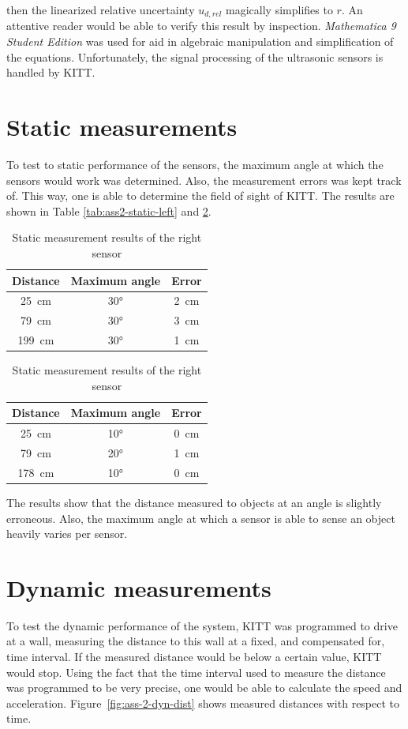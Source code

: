 \documentclass[11pt,titlepage]{report}
\begin{document}
then the linearized relative uncertainty $u_{d,rel}$ magically simplifies to $r$. An attentive reader would be able to verify this result by inspection. \textit{Mathematica 9 Student Edition} was used for aid in algebraic manipulation and simplification of the equations. Unfortunately, the signal processing of the ultrasonic sensors is handled by KITT.

\section{Static measurements}
To test to static performance of the sensors, the maximum angle at which the sensors would work was determined. Also, the measurement errors was kept track of. This way, one is able to determine the field of sight of KITT. The results are shown in Table \ref{tab:ass2-static-left} and \ref{tab:ass2-static-right}.
\begin{table}[H]
	\parbox{.45\linewidth}{
		\centering
		\caption{Static measurement results of the left sensor}
		\label{tab:ass2-static-left}
		\begin{tabular}{c c c}
			\hline\hline
			Distance & Maximum angle & Error \\
			\hline
			\SI{25}{cm} & \ang{30} & \SI{2}{cm} \\
			\SI{79}{cm} & \ang{30} & \SI{3}{cm} \\
			\SI{199}{cm} & \ang{30} & \SI{1}{cm} \\
			\hline
		\end{tabular}
	}
	\parbox{.45\linewidth}{
		\centering
		\caption{Static measurement results of the right sensor}
		\label{tab:ass2-static-right}
		\begin{tabular}{c c c}
			\hline\hline
			Distance & Maximum angle & Error \\
			\hline
			\SI{25}{cm} & \ang{10} & \SI{0}{cm} \\
			\SI{79}{cm} & \ang{20} & \SI{1}{cm} \\
			\SI{178}{cm} & \ang{10} & \SI{0}{cm} \\
			\hline
		\end{tabular}
	}
\end{table}

The results show that the distance measured to objects at an angle is slightly erroneous. Also, the maximum angle at which a sensor is able to sense an object heavily varies per sensor. 

\section{Dynamic measurements}
To test the dynamic performance of the system, KITT was programmed to drive at a wall, measuring the distance to this wall at a fixed, and compensated for, time interval. If the measured distance would be below a certain value, KITT would stop. Using the fact that the time interval used to measure the distance was programmed to be very precise, one would be able to calculate the speed and acceleration. Figure~\ref{fig:ass-2-dyn-dist} shows measured distances with respect to time.
\end{document}
